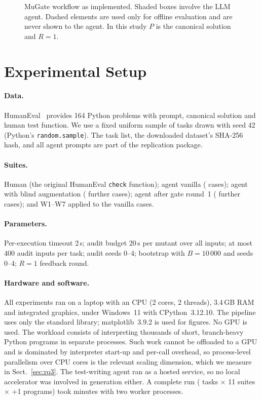 \documentclass[runningheads]{llncs}
\begin{document}
\begin{figure}[t]
\centering

\caption{MuGate workflow as implemented. Shaded boxes involve the LLM agent. Dashed elements are used only for offline evaluation and are never shown to the agent. In this study $P$ is the canonical solution and $R=1$.}\label{fig:workflow}
\end{figure}

\section{Experimental Setup}\label{sec:setup}

\paragraph{Data.} HumanEval~\cite{chen2021codex} provides 164 Python problems with prompt, canonical solution and human test function. We use a fixed uniform sample of \nTasks{} tasks drawn with seed 42 (Python's \texttt{random.sample}). The task list, the downloaded dataset's SHA-256 hash, and all agent prompts are part of the replication package.

\paragraph{Suites.} Human (the original HumanEval \texttt{check} function); agent vanilla (\casesVanillaKept{} cases); agent with blind augmentation (\blindCases{} further cases); agent after gate round~1 (\gateCases{} further cases); and W1--W7 applied to the vanilla cases.

\paragraph{Parameters.} Per-execution timeout 2\,s; audit budget 20\,s per mutant over all inputs; at most 400 audit inputs per task; audit seeds 0--4; bootstrap with $B=10\,000$ and seeds 0--4; $R=1$ feedback round.

\paragraph{Hardware and software.} All experiments ran on a laptop with an \cpuName{} CPU (2 cores, 2 threads), 3.4\,GB RAM and integrated graphics, under Windows~11 with CPython~3.12.10. The pipeline uses only the standard library; matplotlib~3.9.2 is used for figures. No GPU is used. The workload consists of interpreting thousands of short, branch-heavy Python programs in separate processes. Such work cannot be offloaded to a GPU and is dominated by interpreter start-up and per-call overhead, so process-level parallelism over CPU cores is the relevant scaling dimension, which we measure in Sect.~\ref{sec:rq3}. The test-writing agent ran as a hosted service, so no local accelerator was involved in generation either. A complete run (\nTasks{} tasks $\times$ 11 suites $\times$ \nMut{}+1 programs) took \evalWallMin{} minutes with two worker processes.
\end{document}
